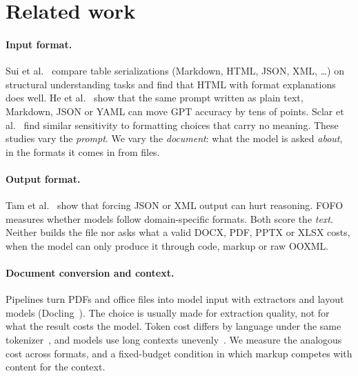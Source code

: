 \section{Related work}
\label{sec:related}

\paragraph{Input format.} Sui et al.~\cite{sui2024tablemeetsllm} compare
table serializations (Markdown, HTML, JSON, XML, \ldots) on structural
understanding tasks and find that HTML with format explanations does well.
He et al.~\cite{he2024promptformatting} show that the same prompt
written as plain text, Markdown, JSON or YAML can move GPT accuracy by tens
of points. Sclar et al.~\cite{sclar2024formatting} find similar sensitivity
to formatting choices that carry no meaning. These studies vary the
\emph{prompt}. We vary the \emph{document}: what the model is asked
\emph{about}, in the formats it comes in from files.

\paragraph{Output format.} Tam et al.~\cite{tam2024speakfreely} show
that forcing JSON or XML output can hurt reasoning. FOFO~\cite{xia2024fofo}
measures whether models follow domain-specific formats. Both score the
\emph{text}. Neither builds the file nor asks what a valid DOCX, PDF, PPTX
or XLSX costs, when the model can only produce it through code, markup or
raw OOXML.

\paragraph{Document conversion and context.} Pipelines turn PDFs and
office files into model input with extractors and layout models
(Docling~\cite{auer2024docling}). The choice is usually made for
extraction quality, not for what the result costs the model. Token cost
differs by language under the same tokenizer~\cite{petrov2023tokenizer},
and models use long contexts unevenly~\cite{liu2024lost}. We measure the
analogous cost across formats, and a fixed-budget condition in which markup
competes with content for the context.
